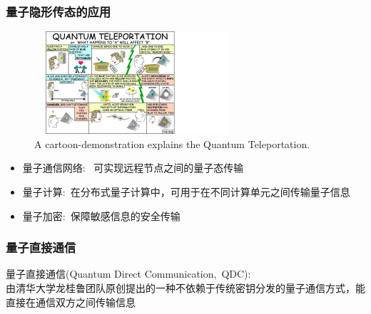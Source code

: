 \begin{frame}
    \frametitle{量子隐形传态的应用}
    \begin{figure}
        \centering
                \includegraphics[height=1.5in, width=3.0in, viewport=0 0 1280 720,clip]{Figures/Quantum_Teleportation.jpg}
		\caption{\tiny{\textrm{A cartoon-demonstration explains the Quantum Teleportation.}}}
		\label{Fig:Quantum_Teleportation}
    \end{figure}
    \vskip -10pt
    \begin{itemize}
        \item 量子通信网络:~%
		可实现远程节点之间的量子态传输\\
		{\fontsize{7.5pt}{5.2pt}\selectfont{为构建大规模、长距离的量子通信网络奠定基础}}
        \item 量子计算:~在分布式量子计算中，可用于在不同计算单元之间传输量子信息\\
		{\fontsize{7.5pt}{5.2pt}\selectfont{提高计算效率和协同性}}
        \item 量子加密:~保障敏感信息的安全传输
		{\fontsize{7.5pt}{5.2pt}\selectfont{结合量子隐形传态和量子密钥分发技术，可进一步增强信息传输的安全性}}
    \end{itemize}
\end{frame}

\begin{frame}
    \frametitle{量子直接通信}
	    量子直接通信\textrm{(Quantum Direct Communication,~QDC)}:\\
		    由清华大学龙桂鲁团队原创提出的一种不依赖于传统密钥分发的量子通信方式，能直接在通信双方之间传输信息
		    {\fontsize{7.5pt}{5.2pt}\selectfont{与传统量子密钥分发后再进行经典加密通信不同，它可直接传递机密信息}}
\end{frame}

